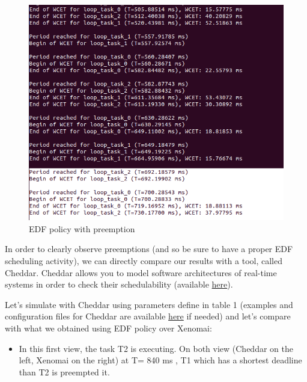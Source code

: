 \documentclass[12pt,hidelinks]{article}
\begin{document}
{\begin{figure}[ht]
\begin{minipage}{0.45\textwidth}
                \includegraphics[width=1.43\textwidth]{DynaWithPreemption.png} %
                \caption{EDF policy with preemption}
            \end{minipage}
        \end{figure} \newline

        
        In order to clearly observe preemptions (and so be sure to have a proper EDF scheduling activity), we can directly compare our results with a tool, called Cheddar. Cheddar allows you to model software architectures of real-time systems in order to check their schedulability (available \href{http://beru.univ-brest.fr/cheddar/#RefDownloadRelease}{here}). 
        
        Let's simulate with Cheddar using parameters define in table 1 (examples and configuration files for Cheddar are available \href{https://github.com/skyultime/M2_ERTS_Project_Xenomai_edh/tree/main/Tests/EDFonXenomai/EDF_Problem}{here} if needed) and let's compare with what we obtained using EDF policy over Xenomai:

        \begin{itemize}
            \item In this first view, the task T2 is executing. On both view (Cheddar on the left, Xenomai on the right) at T= 840 ms , T1 which has a shortest deadline than T2 is preempted it.
            

\end{itemize}}
\end{document}
